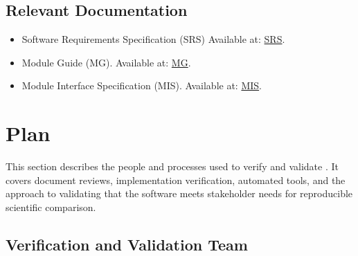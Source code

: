\documentclass[12pt, titlepage]{article}
\begin{document}
\subsection{Relevant Documentation}




\begin{itemize}
  \item Software Requirements Specification (SRS)  Available at: \href{https://github.com/Krozix-2026/cas741-speech-trf/blob/main/docs/SRS/SRS.tex}{SRS}.
  \item Module Guide (MG). Available at: \href{https://github.com/Krozix-2026/cas741-speech-trf/blob/main/docs/Design/SoftArchitecture/MG.tex}{MG}.
  \item Module Interface Specification (MIS). Available at: \href{https://github.com/Krozix-2026/cas741-speech-trf/blob/main/docs/Design/SoftDetailedDes/MIS.tex}{MIS}.
\end{itemize}




\section{Plan}

This section describes the people and processes used to verify and validate \progname{}. 
It covers document reviews, implementation verification, automated tools, and the approach to validating that the software meets stakeholder needs for reproducible scientific comparison.



\subsection{Verification and Validation Team}
\end{document}
